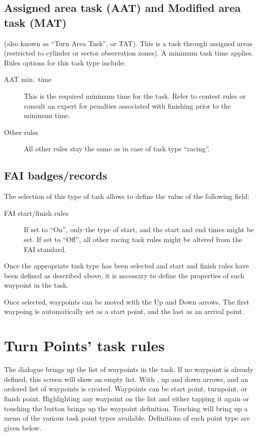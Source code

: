 \subsection*{Assigned area task (AAT) and Modified area task (MAT)}
(also known as ``Turn Area Task'', or TAT).  This is a task through assigned
areas (restricted to cylinder or sector observation zones).  A minimum task time
applies.
Rules options for this task type include:
  \begin{description}
  \item [AAT min.\ time]  This is the required minimum time for the task.  Refer
    to contest rules or consult an expert for penalties associated with finishing
    prior to the minimum time.
  \item [Other rules] All other rules stay the same as in case of task type
    ``racing''.
  \end{description}


\subsection*{FAI badges/records}
The selection of this type of task allows to define the value of the following field:
  \begin{description}
  \item [FAI start/finish rules] If set to ``On'', only the type of start, and the start and end times might be set.
  If set to ``Off'', all other racing task rules might be altered from the FAI standard.
  \end{description}

Once the appropriate task type has been selected and start and finish rules
have been defined as described above, it is necessary to define the properties
of each waypoint in the task.

Once selected, waypoints can be moved with the Up and Down arrows.
The first waypoing is automatically set as a start point, and the last as an arrival point.

\section{Turn Points' task rules}\label{sec:task-rules}

The  dialogue brings up the list of waypoints in the task.
 If no waypoint is already defined, this screen
will show an empty list. With , up and down arrows, and
 an ordered list of waypoints is created.
Waypoints can be start point, turnpoint, or finish point.
Highlighting any waypoint on the list and either tapping it again or
touching the  button brings up the waypoint definition.
Touching  will bring up a menu of the various task point
types available.  Definitions of each point type are given below.

